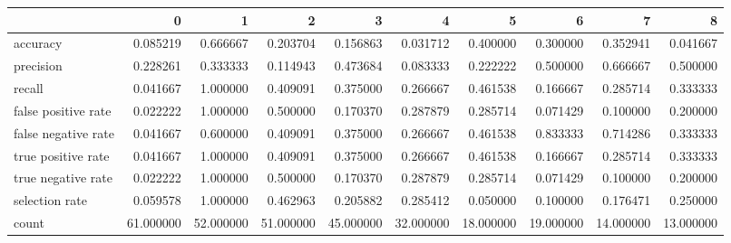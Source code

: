\begin{tabular}{lrrrrrrrrr}
\toprule
{} &          0 &          1 &          2 &          3 &          4 &          5 &          6 &          7 &          8 \\
\midrule
accuracy            &   0.085219 &   0.666667 &   0.203704 &   0.156863 &   0.031712 &   0.400000 &   0.300000 &   0.352941 &   0.041667 \\
precision           &   0.228261 &   0.333333 &   0.114943 &   0.473684 &   0.083333 &   0.222222 &   0.500000 &   0.666667 &   0.500000 \\
recall              &   0.041667 &   1.000000 &   0.409091 &   0.375000 &   0.266667 &   0.461538 &   0.166667 &   0.285714 &   0.333333 \\
false positive rate &   0.022222 &   1.000000 &   0.500000 &   0.170370 &   0.287879 &   0.285714 &   0.071429 &   0.100000 &   0.200000 \\
false negative rate &   0.041667 &   0.600000 &   0.409091 &   0.375000 &   0.266667 &   0.461538 &   0.833333 &   0.714286 &   0.333333 \\
true positive rate  &   0.041667 &   1.000000 &   0.409091 &   0.375000 &   0.266667 &   0.461538 &   0.166667 &   0.285714 &   0.333333 \\
true negative rate  &   0.022222 &   1.000000 &   0.500000 &   0.170370 &   0.287879 &   0.285714 &   0.071429 &   0.100000 &   0.200000 \\
selection rate      &   0.059578 &   1.000000 &   0.462963 &   0.205882 &   0.285412 &   0.050000 &   0.100000 &   0.176471 &   0.250000 \\
count               &  61.000000 &  52.000000 &  51.000000 &  45.000000 &  32.000000 &  18.000000 &  19.000000 &  14.000000 &  13.000000 \\
\bottomrule
\end{tabular}
